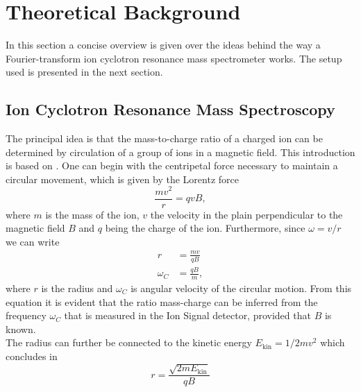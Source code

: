 \documentclass[a4paper,10pt]{article}
\begin{document}
\section{Theoretical Background}
\label{sec_theory}
In this section a concise overview is given over the ideas behind the way a Fourier-transform ion cyclotron resonance mass spectrometer works. The setup used is presented in the next section.

\subsection{Ion Cyclotron Resonance Mass Spectroscopy}
The principal idea is that the mass-to-charge ratio of a charged ion can be determined by circulation of a group of ions in a magnetic field. This introduction is based on \cite{primer}. One can begin with the centripetal force necessary to maintain a circular movement, which is given by the Lorentz force
\begin{equation}
	\frac{m v^2}{r} = q v B,
\end{equation}
where $m$ is the mass of the ion, $v$ the velocity in the plain perpendicular to the magnetic field $B$ and $q$ being the charge of the ion. Furthermore, since $\omega = v/r$ we can write
\begin{equation}
	\label{omega}
	\begin{split}
		r &= \frac{m v}{q B} \\
		\omega_C &= \frac{q B}{m},
	\end{split}
\end{equation}
where $r$ is the radius and $\omega_C$ is angular velocity of the circular motion. From this equation it is evident that the ratio mass-charge can be inferred from the frequency $\omega_C$ that is measured in the Ion Signal detector, provided that $B$ is known.\\
The radius can further be connected to the kinetic energy $E_\mathrm{kin} = 1/2 m v^2$ which concludes in
\begin{equation}
	r = \frac{\sqrt{2 m E_\mathrm{kin}}}{qB}
\end{equation}
\end{document}
